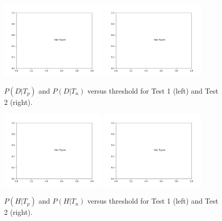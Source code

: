 \documentclass[12pt]{article}
\begin{document}
\begin{figure}
    \centering
    \includegraphics[width=0.45\textwidth]{./figures/empty_fig.png}
    \includegraphics[width=0.45\textwidth]{./figures/empty_fig.png}
    \caption{$P(D|T_p)$ and $P(D|T_n)$ versus threshold for Test 1 (left) and Test 2 (right).}
    \label{fig:probs1}
\end{figure}
\begin{figure}
    \centering
    \includegraphics[width=0.45\textwidth]{./figures/empty_fig.png}
    \includegraphics[width=0.45\textwidth]{./figures/empty_fig.png}
    \caption{$P(H|T_p)$ and $P(H|T_n)$ versus threshold for Test 1 (left) and Test 2 (right).}
    \label{fig:probs2}
\end{figure}
\end{document}
